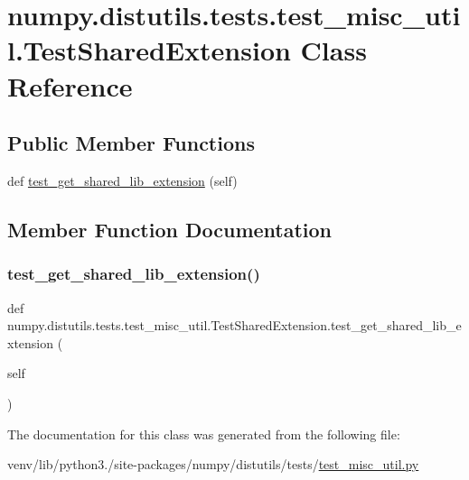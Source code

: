 \hypertarget{classnumpy_1_1distutils_1_1tests_1_1test__misc__util_1_1TestSharedExtension}{}\section{numpy.\+distutils.\+tests.\+test\+\_\+misc\+\_\+util.\+Test\+Shared\+Extension Class Reference}
\label{classnumpy_1_1distutils_1_1tests_1_1test__misc__util_1_1TestSharedExtension}
\subsection*{Public Member Functions}
\begin{DoxyCompactItemize}
\item 
def \hyperlink{classnumpy_1_1distutils_1_1tests_1_1test__misc__util_1_1TestSharedExtension_a6427e5ae2cbe59443e619c800589f72b}{test\+\_\+get\+\_\+shared\+\_\+lib\+\_\+extension} (self)
\end{DoxyCompactItemize}


\subsection{Member Function Documentation}
\mbox{\label{classnumpy_1_1distutils_1_1tests_1_1test__misc__util_1_1TestSharedExtension_a6427e5ae2cbe59443e619c800589f72b}} 
\subsubsection{\texorpdfstring{test\+\_\+get\+\_\+shared\+\_\+lib\+\_\+extension()}{test\_get\_shared\_lib\_extension()}}
{\footnotesize\ttfamily def numpy.\+distutils.\+tests.\+test\+\_\+misc\+\_\+util.\+Test\+Shared\+Extension.\+test\+\_\+get\+\_\+shared\+\_\+lib\+\_\+extension (\begin{DoxyParamCaption}\item[{}]{self }\end{DoxyParamCaption})}



The documentation for this class was generated from the following file\+:\begin{DoxyCompactItemize}
\item 
venv/lib/python3./site-\/packages/numpy/distutils/tests/\hyperlink{test__misc__util_8py}{test\+\_\+misc\+\_\+util.\+py}\end{DoxyCompactItemize}
